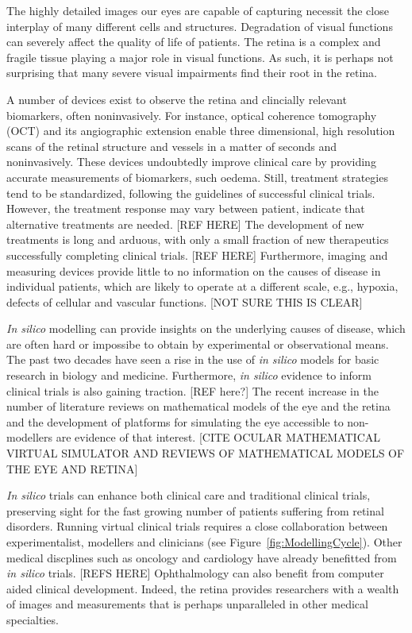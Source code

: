 \documentclass[12pt,a4paper]{article}
\begin{document}
The highly detailed images our eyes are capable of capturing necessit the close interplay of many different cells and structures.
Degradation of visual functions can severely affect the quality of life of patients.
The retina is a complex and fragile tissue playing a major role in visual functions.
As such, it is perhaps not surprising that many severe visual impairments find their root in the retina.

A number of devices exist to observe the retina and clincially relevant biomarkers, often noninvasively.
For instance, optical coherence tomography (OCT) and its angiographic extension enable three dimensional, high resolution scans of the retinal structure and vessels in a matter of seconds and noninvasively.
These devices undoubtedly improve clinical care by providing accurate measurements of biomarkers, such oedema.
Still, treatment strategies tend to be standardized, following the guidelines of successful clinical trials.
However, the treatment response may vary between patient, indicate that alternative treatments are needed. [REF HERE]
The development of new treatments is long and arduous, with only a small fraction of new therapeutics successfully completing clinical trials. [REF HERE]
Furthermore, imaging and measuring devices provide little to no information on the causes of disease in individual patients, which are likely to operate at a different scale, e.g., hypoxia, defects of cellular and vascular functions. [NOT SURE THIS IS CLEAR]

\textit{In silico} modelling can provide insights on the underlying causes of disease, which are often hard or impossibe to obtain by experimental or observational means.
The past two decades have seen a rise in the use of \textit{in silico} models for basic research in biology and medicine.
Furthermore, \textit{in silico} evidence to inform clinical trials is also gaining traction. [REF here?]
The recent increase in the number of literature reviews on mathematical models of the eye and the retina and the development of platforms for simulating the eye accessible to non-modellers are evidence of that interest. [CITE OCULAR MATHEMATICAL VIRTUAL SIMULATOR AND REVIEWS OF MATHEMATICAL MODELS OF THE EYE AND RETINA]

\textit{In silico} trials can enhance both clinical care and traditional clinical trials, preserving sight for the fast growing number of patients suffering from retinal disorders.
Running virtual clinical trials requires a close collaboration between experimentalist, modellers and clinicians (see Figure~\ref{fig:ModellingCycle}).
Other medical discplines such as oncology and cardiology have already benefitted from \textit{in silico} trials. [REFS HERE]
Ophthalmology can also benefit from computer aided clinical development.
Indeed, the retina provides researchers with a wealth of images and measurements that is perhaps unparalleled in other medical specialties.
\end{document}
